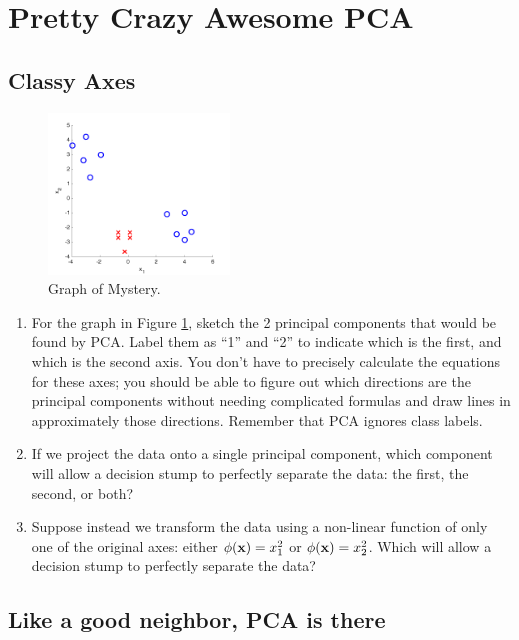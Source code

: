 \section{Pretty Crazy Awesome PCA }

\subsection{Classy Axes}

\begin{figure}[h!]
 \centering
 \includegraphics[width=0.43\textwidth]{images/pca_group1.png}
 \caption{Graph of Mystery.}
 \label{fig:pca1}
\end{figure}

\begin{enumerate}
\item {} For the graph in Figure \ref{fig:pca1}, sketch the 2
  principal components that would be found by PCA. Label them as ``1''
  and ``2'' to indicate which is the first, and which is the second
  axis.  You don't have to precisely calculate the equations for these
  axes; you should be able to figure out which directions are the
  principal components without needing complicated formulas and draw
  lines in approximately those directions.  Remember that PCA ignores
  class labels.

\item {} If we project the data onto a single principal
  component, which component will allow a decision stump to perfectly
  separate the data: the first, the second, or both?

\item {} Suppose instead we transform the data using a
  non-linear function of only one of the original axes: either
  $\phi(\mathbf{x}) = x_1^2$ or $\phi(\mathbf{x}) = x_2^2$. Which will allow a
  decision stump to perfectly separate the data?

\end{enumerate}

\subsection{Like a good neighbor, PCA is there}

